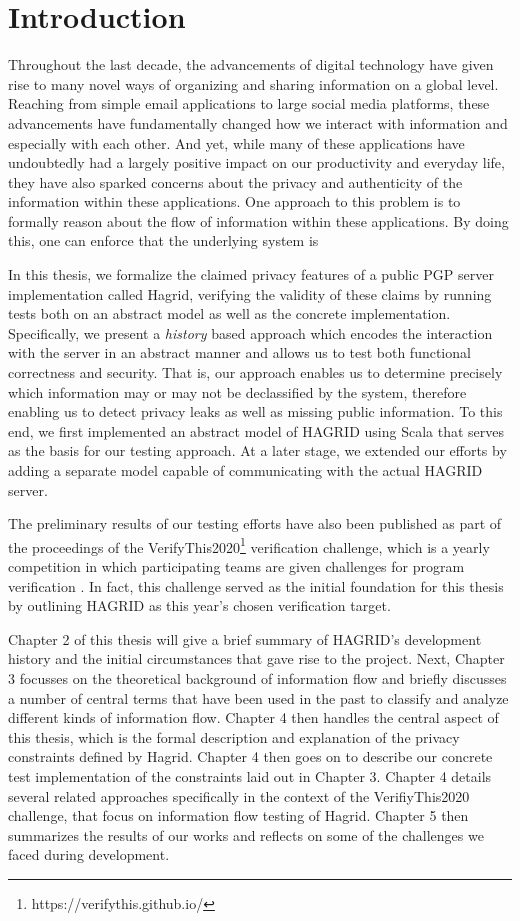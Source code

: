 
\section{Introduction}
Throughout the last decade, the advancements of digital technology have given rise to many novel ways of organizing and sharing information on a global level.
Reaching from simple email applications to large social media platforms, these advancements have fundamentally changed how we interact with information and especially with each other.
And yet, while many of these applications have undoubtedly had a largely positive impact on our productivity and everyday life, they have also sparked concerns about the privacy and authenticity of the information within these applications. 
One approach to this problem is to formally reason about the flow of information within these applications. By doing this, one can enforce that the underlying system is  

In this thesis, we formalize the claimed privacy features of a public PGP server implementation called Hagrid, verifying the validity of these claims by running tests both on an abstract model as well as the concrete implementation. Specifically, we present a \emph{history} based approach which encodes the interaction with the server in an abstract manner and allows us to test both functional correctness and security. That is, our approach enables us to determine precisely which information may or may not be declassified by the system, therefore enabling us to detect privacy leaks as well as missing public information. To this end, we first implemented an abstract model of HAGRID using Scala that serves as the basis for our testing approach. At a later stage, we extended our efforts by adding a separate model capable of communicating with the actual HAGRID server.

The preliminary results of our testing efforts have also been published as part of the proceedings of the VerifyThis2020\footnote{https://verifythis.github.io/} verification challenge, which is a yearly competition in which participating teams are given challenges for program verification \cite{VTLTC2020/IFTesting}. In fact, this challenge served as the initial foundation for this thesis by outlining HAGRID as this year's chosen verification target.

Chapter 2 of this thesis will give a brief summary of HAGRID's development history and the initial circumstances that gave rise to the project. Next, Chapter 3 focusses on the theoretical background of information flow and briefly discusses a number of central terms that have been used in the past to classify and analyze different kinds of information flow.
Chapter 4 then handles the central aspect of this thesis, which is the formal description and explanation of the privacy constraints defined by Hagrid. Chapter 4 then goes on to describe our concrete test implementation of the constraints laid out in Chapter 3.
Chapter 4 details several related approaches specifically in the context of the VerifiyThis2020 challenge, that focus on information flow testing of Hagrid.
Chapter 5 then summarizes the results of our works and reflects on some of the challenges we faced during development.

